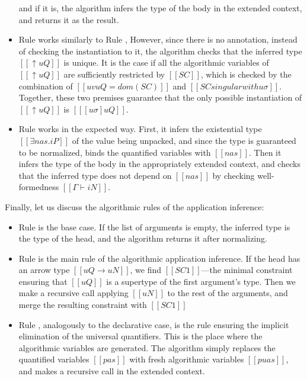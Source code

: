 \documentclass[a4,natbib=false]{article}
\newcommand{\ruleref}[1]{Rule \nameref{#1}}
\begin{document}
\begin{itemize}
    and if it is, the algorithm infers the type of the body in the extended context,
    and returns it as the result. 
  \item \ruleref{\ottdruleATAppLetAnnLabel}
    works similarly to \ruleref{\ottdruleATAppLetAnnLabel},
    However, since there is no annotation, 
    instead of checking the instantiation to it, 
    the algorithm checks that the inferred type
    $[[↑uQ]]$ is unique.
    It is the case if all the algorithmic variables of 
    $[[↑uQ]]$ are sufficiently restricted by $[[SC]]$,
    which is checked by the combination of
    $[[uv uQ = dom(SC)]]$ and $[[SC singular with uσ]]$.
    Together, these two premises guarantee that the only 
    possible instantiation of $[[↑uQ]]$ is $[[ [uσ]uQ ]]$.
  \item \ruleref{\ottdruleATUnpackLabel}
    works in the expected way. First, it infers the 
    existential type $[[∃nas.iP]]$ of the value being unpacked,
    and since the type is guaranteed to be normalized, binds 
    the quantified variables with $[[nas]]$.
    Then it infers the type of the body in the appropriately extended context,
    and checks that the inferred type does not depend on $[[nas]]$
    by checking well-formedness $[[Γ ⊢ iN]]$.
\end{itemize}

Finally, let us discuss the algorithmic rules of the application inference:
\begin{itemize}
  \item \ruleref{\ottdruleATEmptyAppLabel}
    is the base case. If the list of arguments is empty, 
    the inferred type is the type of the head,
    and the algorithm returns it after normalizing.
  \item \ruleref{\ottdruleATArrowAppLabel}
    is the main rule of the algorithmic application inference.
    If the head has an arrow type $[[uQ → uN]]$,
    we find $[[SC1]]$---the minimal constraint ensuring that 
    $[[uQ]]$ is a supertype of the first argument's type.
    Then we make a recursive call applying $[[uN]]$ to the rest of the arguments,
    and merge the resulting constraint with $[[SC1]]$
  \item \ruleref{\ottdruleATForallAppLabel},
    analogously to the declarative case,
    is the rule ensuring the implicit elimination of the universal quantifiers. 
    This is the place where the algorithmic variables are generated.
    The algorithm simply replaces the quantified variables 
    $[[pas]]$ with fresh algorithmic variables $[[puas]]$,
    and makes a recursive call in the extended context. 
\end{itemize}
\end{document}
